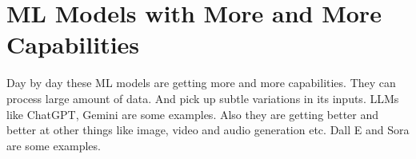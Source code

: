 \documentclass[../../main]{subfiles}
\begin{document}
\section{ML Models with More and More Capabilities} \label{sec:}

Day by day these ML models are getting more and more capabilities. They can
process large amount of data. And pick up subtle variations in its inputs.
LLMs like ChatGPT, Gemini are some examples. Also they are getting better and
better at other things like image, video and audio generation etc. Dall E and
Sora are some examples.
\end{document}
